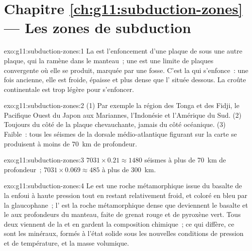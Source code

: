 \section*{Chapitre \ref{ch:g11:subduction-zones} --- Les zones de subduction}

\begin{solution}{exo:g11:subduction-zones:1}
La  est l'enfoncement d'une plaque de  sous
une autre plaque, qui la ramène dans le manteau~; une  est
une limite de plaques convergente où elle se produit, marquée par une fosse.
C'est la  qui s'enfonce~: une fois ancienne, elle est
froide, épaisse et plus dense que l' située dessous. La croûte
continentale est trop légère pour s'enfoncer.
\end{solution}

\begin{solution}{exo:g11:subduction-zones:2}
(1) Par exemple la région des Tonga et des Fidji, le Pacifique Ouest du
Japon aux Mariannes, l'Indonésie et l'Amérique du Sud. (2) Toujours du côté
de la plaque chevauchante, jamais du côté océanique. (3) Faible~: tous les
séismes de la dorsale médio-atlantique figurant sur la carte se produisent
à moins de \qty{70}{km} de profondeur.
\end{solution}

\begin{solution}{exo:g11:subduction-zones:3}
$7031 \times 0.21 \approx 1480$ séismes à plus de \qty{70}{km} de
profondeur~; $7031 \times 0.069 \approx 485$ à plus de \qty{300}{km}.
\end{solution}

\begin{solution}{exo:g11:subduction-zones:4}
Le  est une roche métamorphique issue du basalte de la  enfoui à haute pression tout en restant relativement froid, et
coloré en bleu par la glaucophane~; l' est la roche métamorphique
dense que deviennent le basalte et le  aux profondeurs du manteau,
faite de grenat rouge et de pyroxène vert. Tous deux viennent de la  et en gardent la composition chimique~; ce qui diffère, ce sont
les minéraux, formés à l'état solide sous les nouvelles conditions de
pression et de température, et la masse volumique.
\end{solution}

